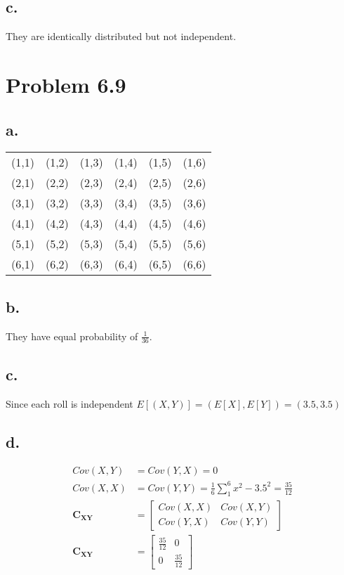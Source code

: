 \documentclass[12pt]{article}
\begin{document}
\subsection{c.}
They are identically distributed but not independent. 

\section{Problem 6.9}
\subsection{a.}
\begin{tabular}{|c|c|c|c|c|c|}
  \hline
  (1,1) & (1,2) & (1,3) & (1,4) & (1,5) & (1,6) \\
  (2,1) & (2,2) & (2,3) & (2,4) & (2,5) & (2,6) \\
  (3,1) & (3,2) & (3,3) & (3,4) & (3,5) & (3,6) \\
  (4,1) & (4,2) & (4,3) & (4,4) & (4,5) & (4,6) \\
  (5,1) & (5,2) & (5,3) & (5,4) & (5,5) & (5,6) \\
  (6,1) & (6,2) & (6,3) & (6,4) & (6,5) & (6,6) \\
  \hline
\end{tabular}

\subsection{b.}
They have equal probability of $\frac{1}{36}$.

\subsection{c.}
Since each roll is independent $ E[(X,Y)] = (E[X],E[Y]) = (3.5,3.5)$

\subsection{d.}
\begin{align*}
  Cov(X,Y) &= Cov(Y,X) = 0 \\
  Cov(X,X) &= Cov(Y,Y) = \frac{1}{6}\sum_1^6 x^2 - 3.5^2 = \frac{35}{12}  \\
  \bm{C_{XY}} &= 
    \begin{bmatrix}
    Cov(X,X) & Cov(X,Y) \\
    Cov(Y,X) & Cov(Y,Y)
    \end{bmatrix} \\
  \bm{C_{XY}} &= 
    \begin{bmatrix}
    \frac{35}{12} & 0 \\
    0 & \frac{35}{12}
    \end{bmatrix}
\end{align*}
\end{document}
